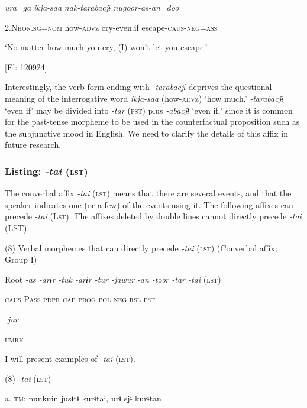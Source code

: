       \textit{ura=ga}  \textit{ikja-saa}  \textit{nak-tarabacjɨ}  \textit{nugoor-as-an=doo}

      2.N\textsc{hon}.\textsc{sg}=\textsc{nom}  how-\textsc{advz}  cry-even.if  escape-\textsc{caus}-\textsc{neg}=\textsc{ass}

      ‘No matter how much you cry, (I) won’t let you escape.’

      [El: 120924]

Interestingly, the verb form ending with \textit{{}-tarabacjɨ} deprives the questional meaning of the interrogative word \textit{ikja-saa} (how-\textsc{advz}) ‘how much.’ \textit{{}-tarabacjɨ} ‘even if’ may be divided into \textit{{}-tar} (\textsc{pst}) plus \textit{{}-abacjɨ} ‘even if,’ since it is common for the past-tense morpheme to be used in the counterfactual proposition such as the subjunctive mood in English. We need to clarify the details of this affix in future research.

\subsubsection{Listing: \textit{{}-tai} (\textsc{lst})}

The converbal affix \textit{{}-tai} (\textsc{lst}) means that there are several events, and that the speaker indicates one (or a few) of the events using it. The following affixes can precede \textit{{}-tai} (L\textsc{st}). The affixes deleted by double lines cannot directly precede \textit{{}-tai} (LST).

(8)  Verbal morphemes that can directly precede \textit{{}-tai} (\textsc{lst}) (Converbal affix; Group I)

  Root  \textit{{}-as  {}-arɨr} %
\textit{{}-tuk  {}-arɨr  {}-tur  {}-jawur} %
\textit{{}-an  {}-təər  {}-tar  {}-tai} (\textsc{lst})

    \textsc{caus}  P\textsc{ass}  \textsc{prpr}  \textsc{cap}  \textsc{prog}  \textsc{pol}  \textsc{neg}  \textsc{rsl}  \textsc{pst}

          \textit{{}-jur} 

          \textsc{umrk}

I will present examples of \textit{{}-tai} (\textsc{lst}).

(8)  \textit{{}-tai} (\textsc{lst})

  a.  \textsc{tm}:  nunkuin  jusɨtɨ  kurɨtai,  urɨ  sjɨ  kurɨtan

